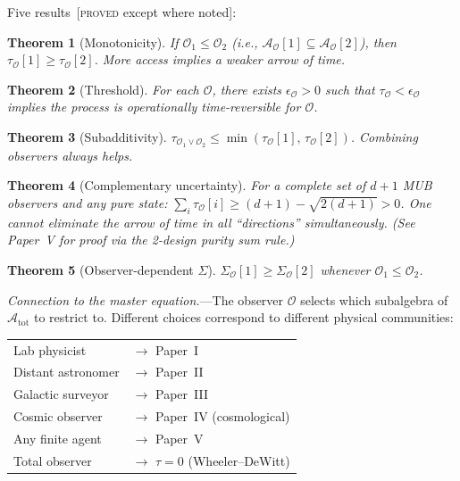 \documentclass[prd,twocolumn,superscriptaddress,longbibliography,floatfix]{revtex4-2}
\newtheorem{theorem}{Theorem}
\newcommand{\tauasym}{\tau}
\newcommand{\Aobs}{\mathcal{A}_{\mathcal{O}}}
\newcommand{\Atot}{\mathcal{A}_{\mathrm{tot}}}
\newcommand{\SigO}{\Sigma_{\mathcal{O}}}
\newcommand{\tauO}{\tauasym_{\mathcal{O}}}
\begin{document}
Five results~[\textsc{proved} except where noted]:

\begin{theorem}[Monotonicity]
\label{thm:monotone}
If $\mathcal{O}_1 \leq \mathcal{O}_2$ (i.e.,
$\Aobs[1] \subseteq \Aobs[2]$), then
$\tauO[1] \geq \tauO[2]$.
More access implies a weaker arrow of time.
\end{theorem}

\begin{theorem}[Threshold]
\label{thm:threshold}
For each $\mathcal{O}$, there exists
$\epsilon_{\mathcal{O}} > 0$ such that
$\tauO < \epsilon_{\mathcal{O}}$ implies the process is
operationally time-reversible for $\mathcal{O}$.
\end{theorem}

\begin{theorem}[Subadditivity]
\label{thm:subadditivity}
$\tauasym_{\mathcal{O}_1 \vee \mathcal{O}_2}
\leq \min(\tauO[1],\,\tauO[2])$.
Combining observers always helps.
\end{theorem}

\begin{theorem}[Complementary uncertainty]
\label{thm:complementary}
For a complete set of $d+1$ MUB observers and any pure state:
$\sum_i \tauO[i] \geq (d+1) - \sqrt{2(d+1)} > 0$.
One cannot eliminate the arrow of time in all
``directions'' simultaneously.
(See Paper~V for proof via the 2-design purity sum rule.)
\end{theorem}

\begin{theorem}[Observer-dependent $\Sigma$]
\label{thm:obs_sigma}
$\SigO[1] \geq \SigO[2]$
whenever $\mathcal{O}_1 \leq \mathcal{O}_2$.
\end{theorem}

\emph{Connection to the master equation.}---The observer
$\mathcal{O}$ selects which subalgebra of $\Atot$ to
restrict to.  Different choices correspond to different
physical communities:
\begin{center}
\begin{tabular}{ll}
Lab physicist & $\to$ Paper~I \\
Distant astronomer & $\to$ Paper~II \\
Galactic surveyor & $\to$ Paper~III \\
Cosmic observer & $\to$ Paper~IV (cosmological) \\
Any finite agent & $\to$ Paper~V \\
Total observer & $\to$ $\tauasym = 0$ (Wheeler--DeWitt)
\end{tabular}
\end{center}
\end{document}
